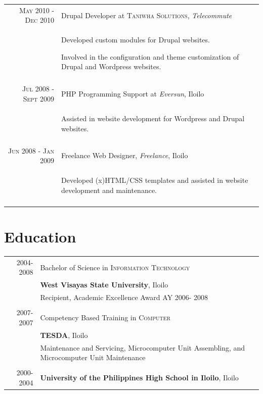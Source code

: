 \documentclass[a4paper,10pt]{article}
\begin{document}
\begin{tabular}{r|p{11cm}}
  \textsc{May 2010 - Dec 2010} & Drupal Developer at \textsc{Taniwha Solutions}, \emph{Telecommute}\\ &
  \begin{blacklist}
    \item Developed custom modules for Drupal websites.
    \item Involved in the configuration and theme customization of Drupal and Wordpress websites.
  \end{blacklist}\\
  \multicolumn{2}{c}{}\\

  \textsc{Jul 2008 - Sept 2009} & PHP Programming Support at \emph{Eversun}, Iloilo\\ &
  \begin{blacklist}
    \item Assisted in website development for Wordpress and Drupal websites.
  \end{blacklist}\\
  \multicolumn{2}{c}{}\\

  \textsc{Jun 2008 - Jan 2009} & Freelance Web Designer, \emph{Freelance}, Iloilo\\ &
  \begin{blacklist}
    \item Developed (x)HTML/CSS templates and assisted in website development and maintenance.
  \end{blacklist}\\
  \multicolumn{2}{c}{}\\
\end{tabular}

\section{Education}

\begin{tabular}{rp{12cm}}
  \textsc{2004-2008} & Bachelor of Science in \textsc{Information Technology}\\&\textbf{West Visayas State University}, Iloilo\\&\small{Recipient, Academic Excellence Award AY 2006- 2008}\\&\\
  \textsc{2007-2007} & Competency Based Training in \textsc{Computer}\\&\textbf{TESDA}, Iloilo\\&\small{Maintenance and Servicing, Microcomputer Unit  Assembling, and Microcomputer Unit Maintenance}\\&\\
  \textsc{2000-2004} & \textbf{University of the Philippines High School in Iloilo}, Iloilo\\
\end{tabular}
\end{document}
